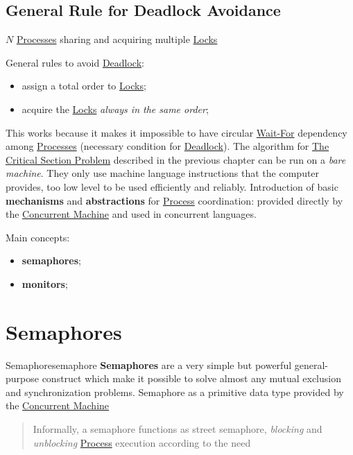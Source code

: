 \subsection{General Rule for Deadlock Avoidance}\label{sub:pi_general_rule_for_deadlock_avoidance} %
\begin{note}
    $N$ \hyperref[def:process]{Processes} sharing and acquiring multiple \hyperref[sub:cp_locks]{Locks}
\end{note}
\begin{note}
    General rules to avoid \hyperref[def:deadlock]{Deadlock}:
    \begin{itemize}
        \item assign a total order to \hyperref[sub:cp_locks]{Locks};
        \item acquire the \hyperref[sub:cp_locks]{Locks} \textit{always in the same order};
    \end{itemize}
\end{note}
This works because it makes it impossible to have circular \hyperref[par:dp_second_solution_no_wait_for_chain]{Wait-For} dependency among \hyperref[def:process]{Processes} (necessary condition for \hyperref[def:deadlock]{Deadlock}).
%
The algorithm for \hyperref[sec:cp_the_critical_section_problem]{The Critical Section Problem} described in the previous chapter can be run on a \textit{bare machine}.
They only use machine language instructions that the computer provides, too low level to be used efficiently and reliably.
\emptyln{}
Introduction of basic \textbf{mechanisms} and \textbf{abstractions} for \hyperref[def:process]{Process} coordination: provided directly by the \hyperref[def:conc-machine]{Concurrent Machine} and used in concurrent languages.
\begin{note}
    Main concepts:
    \begin{itemize}
        \item \textbf{semaphores};
        \item \textbf{monitors};
    \end{itemize}
\end{note}
%
\section{Semaphores}\label{sec:cp_semaphores} %
\begin{note}
\end{note}
\begin{definition}{Semaphore}{semaphore}
    \textbf{Semaphores} are a very simple but powerful general-purpose construct which make it possible to solve almost any mutual exclusion and synchronization problems.
    Semaphore as a primitive data type provided by the \hyperref[def:conc-machine]{Concurrent Machine}
\end{definition}
\begin{quote}
    Informally, a semaphore functions as street semaphore, \textit{blocking} and \textit{unblocking} \hyperref[def:process]{Process} execution according to the need
\end{quote}
